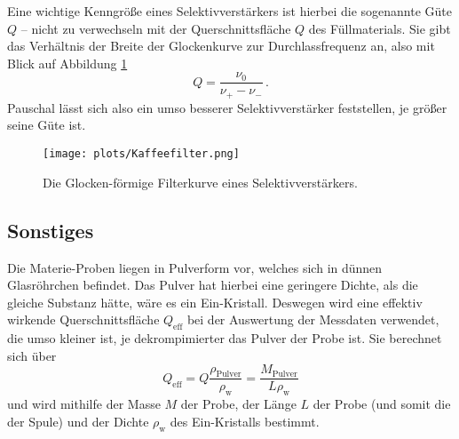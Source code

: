     Eine wichtige Kenngröße eines Selektivverstärkers ist hierbei die sogenannte Güte $Q$ -- nicht zu verwechseln mit der 
    Querschnittsfläche $Q$ des Füllmaterials. 
    Sie gibt das Verhältnis der Breite der Glockenkurve zur Durchlassfrequenz an, also mit Blick auf Abbildung \ref{fig:Kaffeefilter}
    \begin{equation*}
        Q=\frac{\nu _0}{\nu_+ -\nu_-}\,.
    \end{equation*}
    Pauschal lässt sich also ein umso besserer Selektivverstärker feststellen, je größer seine Güte ist. 
    \begin{figure}
        \centering
        \texttt{[image: plots/Kaffeefilter.png]}
        \caption{Die Glocken-förmige Filterkurve eines Selektivverstärkers\cite{Versuchsanleitung}.}
        \label{fig:Kaffeefilter}
    \end{figure}

\subsection{Sonstiges}

    Die Materie-Proben liegen in Pulverform vor, welches sich in dünnen Glasröhrchen befindet. 
    Das Pulver hat hierbei eine geringere Dichte, als die gleiche Substanz hätte, wäre es ein Ein-Kristall.
    Deswegen wird eine effektiv wirkende Querschnittsfläche $Q_\text{eff}$ bei der Auswertung der Messdaten verwendet, 
    die umso kleiner ist, je dekrompimierter das Pulver der Probe ist. 
    Sie berechnet sich über 
    \begin{equation}
        Q_\text{eff}=Q\frac{\rho_\text{Pulver}}{\rho_\text{w}}=\frac{M_\text{Pulver}}{L \rho_\text{w}}
        \label{eqn:effQ}
    \end{equation}
    und wird mithilfe der Masse $M$ der Probe, der Länge $L$ der Probe (und somit die der Spule) und der 
    Dichte $\rho_\text{w}$ des Ein-Kristalls bestimmt. 